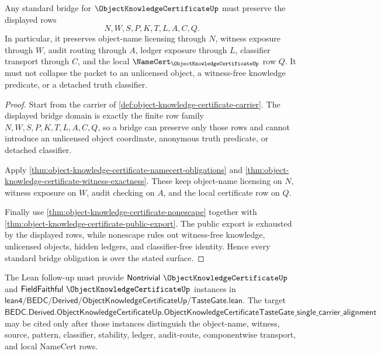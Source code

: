 \begin{theorem}
\label{thm:object-knowledge-certificate-bridge-obligation-surface}
Any standard bridge for $\ObjectKnowledgeCertificateUp$ must preserve the displayed rows
$$
N,W,S,P,K,T,L,A,C,Q.
$$
In particular, it preserves object-name licensing through $N$, witness exposure through $W$, audit routing through $A$, ledger exposure through $L$, classifier transport through $C$, and the local $\NameCert_{\ObjectKnowledgeCertificateUp}$ row $Q$. It must not collapse the packet to an unlicensed object, a witness-free knowledge predicate, or a detached truth classifier.
\end{theorem}
\begin{proof}
Start from the carrier of \autoref{def:object-knowledge-certificate-carrier}. The displayed bridge domain is exactly the finite row family $N,W,S,P,K,T,L,A,C,Q$, so a bridge can preserve only those rows and cannot introduce an unlicensed object coordinate, anonymous truth predicate, or detached classifier.

Apply \autoref{thm:object-knowledge-certificate-namecert-obligations} and \autoref{thm:object-knowledge-certificate-witness-exactness}. These keep object-name licensing on $N$, witness exposure on $W$, audit checking on $A$, and the local certificate row on $Q$.

Finally use \autoref{thm:object-knowledge-certificate-nonescape} together with \autoref{thm:object-knowledge-certificate-public-export}. The public export is exhausted by the displayed rows, while nonescape rules out witness-free knowledge, unlicensed objects, hidden ledgers, and classifier-free identity. Hence every standard bridge obligation is over the stated surface.
\end{proof}



The Lean follow-up must provide $\mathsf{Nontrivial}\ \ObjectKnowledgeCertificateUp$ and $\mathsf{FieldFaithful}\ \ObjectKnowledgeCertificateUp$ instances in $\mathsf{lean4/BEDC/Derived/ObjectKnowledgeCertificateUp/TasteGate.lean}$. The target $\mathsf{BEDC.Derived.ObjectKnowledgeCertificateUp.ObjectKnowledgeCertificateTasteGate\_single\_carrier\_alignment}$ may be cited only after those instances distinguish the object-name, witness, source, pattern, classifier, stability, ledger, audit-route, componentwise transport, and local NameCert rows.

